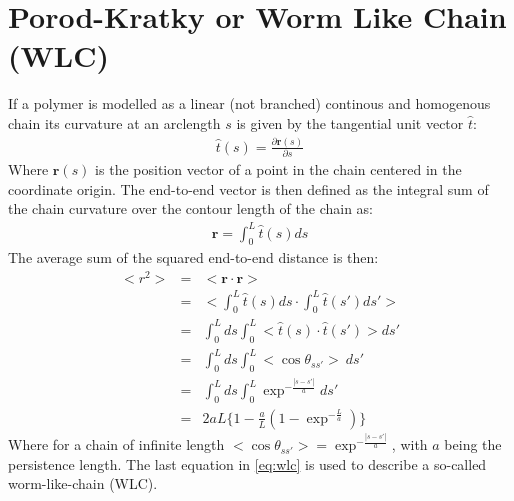 \section{Porod-Kratky or Worm Like Chain (WLC)}
If a polymer is modelled as a linear (not branched) continous and
homogenous chain its curvature at an arclength $s$ is given by the
tangential unit vector $\hat{t}$:
\begin{gather}
\hat{t}(s)=\frac{\partial{\textbf{r}(s)}}{\partial{s}}
\end{gather}
Where $\textbf{r}(s)$ is the position vector of a point in the chain
centered in the coordinate origin.
The end-to-end vector is then defined as the integral sum of the chain
curvature over the contour length of the chain as:
\begin{gather}
\textbf{r}=\int_{0}^{L}\hat{t}(s)ds
\end{gather}
The average sum of the squared end-to-end distance is then:
\begin{eqnarray}
\label{eq:wlc}
<r^2> & = & <\textbf{r} \cdot \textbf{r}> \nonumber \\
               & = & <\int_{0}^{L}\hat{t}(s)ds \cdot \int_{0}^{L}\hat{t}(s')ds' >\nonumber \\
               & = & \int_{0}^{L} ds \int_{0}^{L}<\hat{t}(s) \cdot \hat{t}(s')>ds' \nonumber \\
               & = & \int_{0}^{L} ds \int_{0}^{L} <\cos{\theta}_{ss'}>~ ds' \nonumber \\
               & = & \int_{0}^{L} ds \int_{0}^{L} \exp^{-\frac{|s-s'|}{a}} ds' \nonumber \\
               & = & 2aL \{ 1 - \frac{a}{L}(1-\exp^{-\frac{L}{a}})\}
\end{eqnarray}
Where  for   a  chain  of  infinite   length  $<\cos{\theta_{ss'}}>  =
\exp^{-\frac{|s-s'|}{a}}$, with $a$ being the persistence length.  The
last   equation  in   \ref{eq:wlc}   is  used   to   describe  a   so-called
worm-like-chain (WLC).

